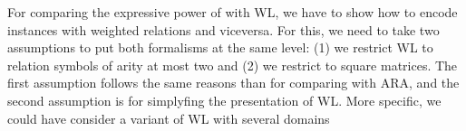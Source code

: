 For comparing the expressive power of \langprod with WL, we have to show how to encode \lang instances with weighted relations and viceversa. For this, we need to take two assumptions to put both formalisms at the same level: (1) we restrict WL to relation symbols of arity at most two and (2) we restrict \langprod to square matrices. The first assumption follows the same reasons than for comparing \langsum with ARA, and the second assumption is for simplyfing the presentation of WL. More specific, we could have consider a variant of WL with several domains

